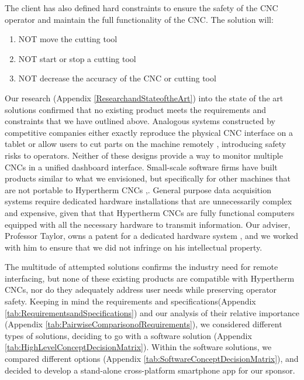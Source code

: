 \documentclass[12pt,letterpaper,titlepage]{article}
\newlength{\wideitemsep}
\let\olditem\item
\renewcommand{\item}{\setlength{\itemsep}{\wideitemsep}\olditem}
\begin{document}
The client has also defined hard constraints to ensure the safety of the CNC operator and maintain the full functionality of the CNC. The solution will:
\begin{enumerate}
\item NOT move the cutting tool
\item NOT start or stop a cutting tool
\item NOT decrease the accuracy of the CNC or cutting tool
\end{enumerate}

Our research (Appendix \ref{ResearchandStateoftheArt}) into the state of the art solutions confirmed that no existing product meets the requirements and constraints that we have outlined above. Analogous systems constructed by competitive companies either exactly reproduce the physical CNC interface on a tablet \cite{fanuc} or allow users to cut parts on the machine remotely \cite{burny}, introducing safety risks to operators. Neither of these designs provide a way to monitor multiple CNCs in a unified dashboard interface. Small-scale software firms have built products similar to what we envisioned, but specifically for other machines that are not portable to Hypertherm CNCs \cite{sdart},\cite{mckenna}. General purpose data acquisition systems require dedicated hardware installations \cite{predatormdc} that are unnecessarily complex and expensive, given that that Hypertherm CNCs are fully functional computers equipped with all the necessary hardware to transmit information. Our adviser, Professor Taylor, owns a patent for a dedicated hardware system \cite{patent}, and we worked with him to ensure that we did not infringe on his intellectual property.

The multitude of attempted solutions confirms the industry need for remote interfacing, but none of these existing products are compatible with Hypertherm CNCs, nor do they adequately address user needs while preserving operator safety. Keeping in mind the requirements and specifications(Appendix \ref{tab:RequirementsandSpecifications}) and our analysis of their relative importance (Appendix \ref{tab:PairwiseComparisonofRequirements}), we considered different types of solutions, deciding to go with a software solution (Appendix \ref{tab:HighLevelConceptDecisionMatrix}). Within the software solutions, we compared different options (Appendix \ref{tab:SoftwareConceptDecisionMatrix}), and decided to develop a stand-alone cross-platform smartphone app for our sponsor.
\end{document}
